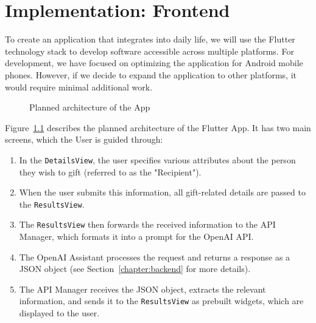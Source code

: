 \chapter{Implementation: Frontend}
\label{chapter:implementation-frontend}

To create an application that integrates into daily life, we will use the Flutter technology stack to develop software accessible across multiple platforms. For development, we have focused on optimizing the application for Android mobile phones. However, if we decide to expand the application to other platforms, it would require minimal additional work.

\begin{figure}[!ht]
	\centering

	\caption{Planned architecture of the App}
	\label{fig:architecture}
\end{figure}

Figure~\ref{fig:architecture} describes the planned architecture of the Flutter App. It has two main screens, which the User is guided through:
\begin{enumerate}
	\item In the \texttt{DetailsView}, the user specifies various attributes about the person they wish to gift (referred to as the "Recipient").
	\item When the user submits this information, all gift-related details are passed to the \texttt{ResultsView}.
	\item The \texttt{ResultsView} then forwards the received information to the API Manager, which formats it into a prompt for the OpenAI API.
	\item The OpenAI Assistant processes the request and returns a response as a JSON object (see Section~\ref{chapter:backend} for more details).
	\item The API Manager receives the JSON object, extracts the relevant information, and sends it to the \texttt{ResultsView} as prebuilt widgets, which are displayed to the user.
\end{enumerate}

